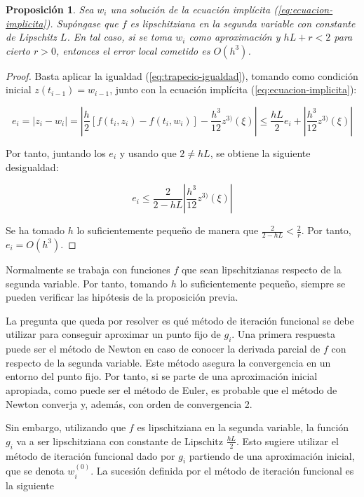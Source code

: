\documentclass{article}
\theoremstyle{theorem-style}  %
\newtheorem{proposition}[theorem]{Proposición}
\theoremstyle{definition-style}
\theoremstyle{example-style}
\begin{document}
	\begin{proposition} \label{prop:implicito:error}
		Sea $w_i$ una solución de la ecuación implícita (\ref{eq:ecuacion-implicita}). Supóngase que $f$ es lipschitziana en la segunda variable con constante de Lipschitz $L$. En tal caso, si se toma $w_i$ como aproximación y $hL+r < 2$ para cierto $r >0$, entonces el error local cometido es $O(h^3)$.
	\end{proposition}
	
	\begin{proof}
		Basta aplicar la igualdad (\ref{eq:trapecio-igualdad}), tomando como condición inicial $z(t_{i-1}) = w_{i-1}$, junto con la ecuación implícita (\ref{eq:ecuacion-implicita}):

		$$ e_i = \left|z_i - w_i \right| = \left|\frac{h}{2} \left[ f(t_i, z_i) - f(t_i, w_i) \right] - \frac{h^3}{12}z^{3)}(\xi) \right| \le \frac{hL}{2} e_i + \left|\frac{h^3}{12}z^{3)}(\xi) \right| $$
		
		Por tanto, juntando los $e_i$ y usando que $2 \ne hL$, se obtiene la siguiente desigualdad:
		
		$$ e_i \le \frac{2}{2-hL} \left|\frac{h^3}{12}z^{3)}(\xi) \right| $$
		
		Se ha tomado $h$ lo suficientemente pequeño de manera que $\frac{2}{2-hL} < \frac{2}{r}$. Por tanto, $e_i = O(h^3)$. 
	\end{proof}

	Normalmente se trabaja con funciones $f$ que sean lipschitzianas respecto de la segunda variable. Por tanto, tomando $h$ lo suficientemente pequeño, siempre se pueden verificar las hipótesis de la proposición previa.
	
	La pregunta que queda por resolver es qué método de iteración funcional se debe utilizar para conseguir aproximar un punto fijo de $g_i$. Una primera respuesta puede ser el método de Newton en caso de conocer la derivada parcial de $f$ con respecto de la segunda variable. Este método asegura la convergencia en un entorno del punto fijo. Por tanto, si se parte de una aproximación inicial apropiada, como puede ser el método de Euler, es probable que el método de Newton converja y, además, con orden de convergencia 2.
	
	Sin embargo, utilizando que $f$ es lipschitziana en la segunda variable, la función $g_i$ va a ser lipschitziana con constante de Lipschitz $\frac{hL}{2}$. Esto sugiere utilizar el método de iteración funcional dado por $g_i$ partiendo de una aproximación inicial, que se denota $w_i^{(0)}$. La sucesión definida por el método de iteración funcional es la siguiente
	
\end{document}
